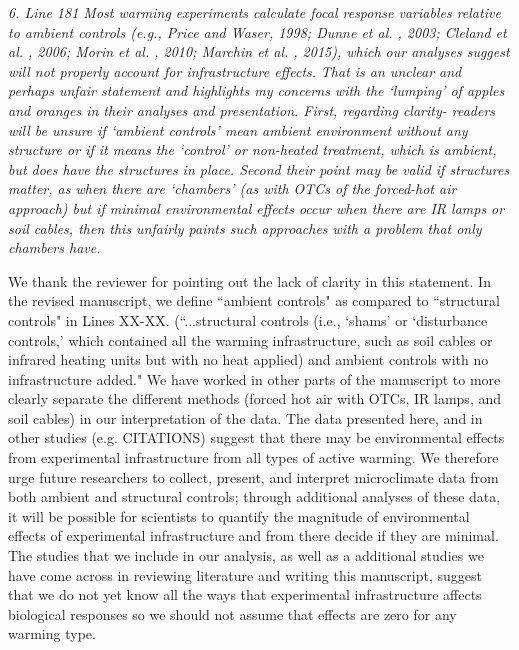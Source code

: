 \documentclass[11pt,a4paper]{letter}
\begin{document}
\par \emph{6. Line 181 Most warming experiments calculate focal response variables relative to ambient controls (e.g., Price and Waser, 1998; Dunne et al. , 2003; Cleland et al. , 2006; Morin et al. , 2010; Marchin et al. , 2015), which our analyses suggest will not properly account for infrastructure effects.}
\emph{That is an unclear and perhaps unfair statement and highlights my concerns with the `lumping' of apples and oranges in their analyses and presentation. First, regarding clarity- readers will be unsure if `ambient controls' mean ambient environment without any structure or if it means the `control' or non-heated treatment, which is ambient, but does have the structures in place. Second their point may be valid if structures matter, as when there are `chambers' (as with OTCs of the forced-hot air approach) but if minimal environmental effects occur when there are IR lamps or soil cables, then this unfairly paints such approaches with a problem that only chambers have.}

\par We thank the reviewer for pointing out the lack of clarity in this statement. In the revised manuscript, we define ``ambient controls" as compared to ``structural controls" in Lines XX-XX. (``...structural controls (i.e., `shams' or `disturbance controls,' which contained all the warming infrastructure, such as soil cables or infrared heating units but with no heat applied) and ambient controls with no infrastructure added." We have worked in other parts of the manuscript to more clearly separate the different methods (forced hot air with OTCs, IR lamps, and soil cables) in our interpretation of the data. The data presented here, and in other studies (e.g. CITATIONS) suggest that there may be environmental effects from experimental infrastructure from all types of active warming. We therefore urge future researchers to collect, present, and interpret microclimate data from both ambient and structural controls; through additional analyses of these data, it will be possible for scientists to quantify the magnitude of environmental effects of experimental infrastructure and from there decide if they are minimal. The studies that we include in our analysis, as well as a additional studies we have come across in reviewing literature and writing this manuscript, suggest that we do not yet know all the ways that experimental infrastructure affects biological responses so we should not assume that effects are zero for any warming type. 
\end{document}
